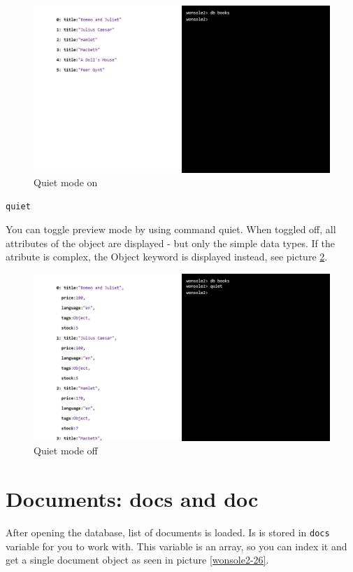 \begin{figure}
\centering
\includegraphics[width=\textwidth]{../../manual/screenshot/wonsole2/wonsole2-18.png}
\caption{Quiet mode on}
\label{wonsole2-18}
\end{figure}

\begin{verbatim}
quiet
\end{verbatim}

You can toggle preview mode by using command quiet. When toggled off, all
attributes of the object are displayed - but only the simple data types. If the
atribute is complex, the Object keyword is displayed instead, see picture
\ref{wonsole2-20}.

\begin{figure}
\centering
\includegraphics[width=\textwidth]{../../manual/screenshot/wonsole2/wonsole2-20.png}
\caption{Quiet mode off}
\label{wonsole2-20}
\end{figure}


\section{Documents: docs and doc}
After opening the database, list of documents is loaded. Is is stored in
\verb|docs| variable for you to work with. This variable is an array, so you can
index it and get a single document object as seen in picture \ref{wonsole2-26}.

